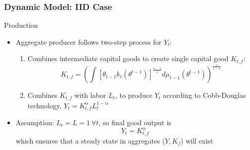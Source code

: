 \documentclass{beamer}
\begin{document}
\begin{frame}
    \frametitle{Dynamic Model: IID Case}

    Production 
    \begin{itemize}
        \item Aggregate producer follows two-step process for \( Y_t \): 
        \begin{enumerate}
            \item Combines intermediate capital goods to create single capital good \( K_{t,f} \): 
            \begin{equation*}
                K_{t,f}=\left(\int\left[\theta_{t-1}k_{t}\left(\theta^{t-1}\right)\right]^{\frac{\varepsilon-1}{\varepsilon}}d\mu_{t-1}\left(\theta^{t-1}\right)\right)^{\frac{\varepsilon}{\varepsilon-1}}
            \end{equation*} 
            \item Combines \( K_{t,f} \) with labor \( L_t \), to produce \( Y_t \) according to Cobb-Douglas technology, \( Y_t = K_{t,f}^\alpha L_t^{1-\alpha} \)
        \end{enumerate}
        \item Assumption: \( L_t = L = 1 \ \forall t \), so final good output is 
            \begin{equation*}
                Y_t = K_{t,f}^\alpha
            \end{equation*}
            which ensures that a steady state in aggregates (\( Y,K_f \)) will exist
    \end{itemize}

\end{frame}
\end{document}
